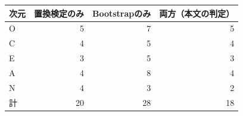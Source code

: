 \begin{tabular}{lrrr}
\toprule
次元 & 置換検定のみ & Bootstrapのみ & 両方（本文の判定） \\
\midrule
O & 5 & 7 & 5 \\
C & 4 & 5 & 4 \\
E & 3 & 5 & 3 \\
A & 4 & 8 & 4 \\
N & 4 & 3 & 2 \\
\midrule
計 & 20 & 28 & 18 \\
\bottomrule
\end{tabular}

